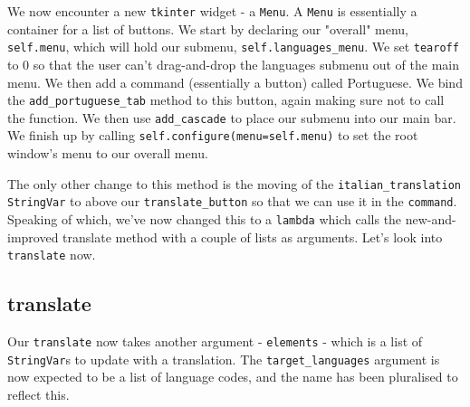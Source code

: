 \documentclass[a4paper,11pt,openany]{book}
\begin{document}
We now encounter a new \lstinline[columns=fixed]{tkinter} widget - a \lstinline[columns=fixed]{Menu}. A \lstinline[columns=fixed]{Menu} is essentially a container for a list of buttons. We start by declaring our "overall" menu, \lstinline[columns=fixed]{self.menu}, which will hold our submenu, \lstinline[columns=fixed]{self.languages_menu}. We set \lstinline[columns=fixed]{tearoff} to 0 so that the user can't drag-and-drop the languages submenu out of the main menu. We then add a command (essentially a button) called Portuguese. We bind the \lstinline[columns=fixed]{add_portuguese_tab} method to this button, again making sure not to call the function. We then use \lstinline[columns=fixed]{add_cascade} to place our submenu into our main bar. We finish up by calling \lstinline[columns=fixed]{self.configure(menu=self.menu)} to set the root window's menu to our overall menu.  

\vspace{5mm}
 
The only other change to this method is the moving of the \lstinline[columns=fixed]{italian_translation StringVar} to above our \lstinline[columns=fixed]{translate_button} so that we can use it in the \lstinline[columns=fixed]{command}. Speaking of which, we've now changed this to a \lstinline[columns=fixed]{lambda} which calls the new-and-improved translate method with a couple of lists as arguments. Let's look into \lstinline[columns=fixed]{translate} now.


\subsection{translate}

Our \lstinline[columns=fixed]{translate} now takes another argument - \lstinline[columns=fixed]{elements} - which is a list of \lstinline[columns=fixed]{StringVar}s to update with a translation. The \lstinline[columns=fixed]{target_languages} argument is now expected to be a list of language codes, and the name has been pluralised to reflect this. 

\vspace{5mm}
\end{document}

